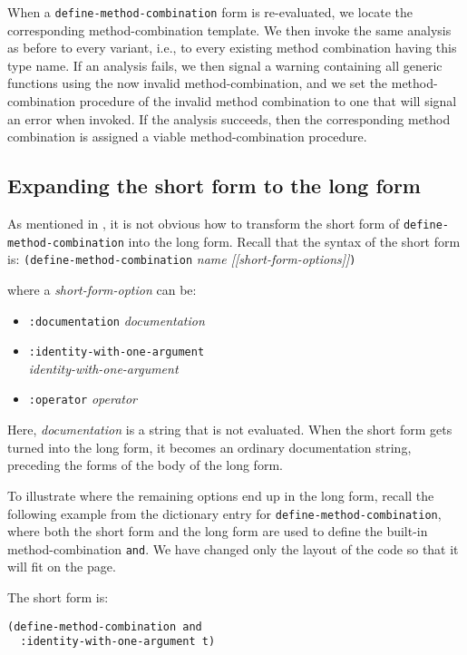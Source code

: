 When a \texttt{define-method-combination} form is re-evaluated, we
locate the corresponding method-combination template.  We then invoke
the same analysis as before to every variant, i.e., to every existing
method combination having this type name.  If an analysis fails, we
then signal a warning containing all generic functions using the now
invalid method-combination, and we set the method-combination
procedure of the invalid method combination to one that will signal an
error when invoked.  If the analysis succeeds, then the corresponding
method combination is assigned a viable method-combination procedure.

\subsection{Expanding the short form to the long form}

As mentioned in , it is not obvious how to
transform the short form of \texttt{define-method-combination} into
the long form.  Recall that the syntax of the short form is:
\vskip 0.1cm
\noindent
\texttt{(define-method-combination} \textit{name [[short-form-options]]}\texttt{)}

where a \textit{short-form-option} can be:

\begin{itemize}
\item \texttt{:documentation} \textit{documentation}
\item \texttt{:identity-with-one-argument}\\ \textit{identity-with-one-argument}
\item \texttt{:operator} \textit{operator}
\end{itemize}

Here, \textit{documentation} is a string that is not evaluated.  When
the short form gets turned into the long form, it becomes an ordinary
documentation string, preceding the forms of the body of the long
form.

To illustrate where the remaining options end up in the long form,
recall the following example from the dictionary entry for
\texttt{define-method-combination}, where both the short form and the
long form are used to define the built-in method-combination
\texttt{and}.  We have changed only the layout of the code so that it
will fit on the page.

\noindent
The short form is:

{\small\begin{verbatim}
(define-method-combination and
  :identity-with-one-argument t)
\end{verbatim}}

